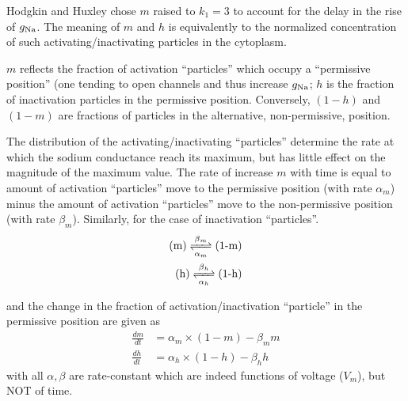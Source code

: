 \begin{mdframed}

Hodgkin and Huxley chose  $m$ raised to $k_1=3$ to account for the delay in
the rise of $g_{\ce{Na}}$. The meaning of $m$ and $h$ is equivalently to the
normalized concentration of such activating/inactivating particles
in the cytoplasm.  
  
$m$ reflects the fraction of activation ``particles'' which occupy a
``permissive position'' (one tending to open channels and thus increase
$g_{\ce{Na}}$; $h$ is the fraction of inactivation particles in the permissive
position. Conversely, $(1-h)$ and $(1-m)$ are fractions of particles in the
alternative, non-permissive, position.

  The distribution of the activating/inactivating ``particles''
  determine the rate at which the sodium conductance reach its
  maximum, but has little effect on the magnitude of the maximum
  value.  The rate of increase $m$ with time is equal to amount of
  activation ``particles'' move to the permissive position (with rate
  $\alpha_m$) minus the amount of activation ``particles'' move to the
  non-permissive position (with rate $\beta_m$). Similarly, for the
  case of inactivation ``particles''.
  \begin{equation}
    \label{eq:826}
    \begin{split}
      \text{(m)} \ce{<=>[\beta_m][\alpha_m]} \text{(1-m)} \\
      \text{(h)} \ce{<=>[\beta_h][\alpha_h]} \text{(1-h)} \\
    \end{split}
  \end{equation}

  and the change in the fraction of activation/inactivation
  ``particle'' in the permissive position are given as
\begin{equation}
  \label{eq:65}
  \begin{split}
    \frac{dm}{dt} &= \alpha_m \times (1-m) - \beta_m m \\
    \frac{dh}{dt} &= \alpha_h \times (1-h) - \beta_h h
  \end{split}
\end{equation}
with all $\alpha,\beta$ are rate-constant which are indeed functions
of voltage ($V_m$), but NOT of time.
\end{mdframed}

